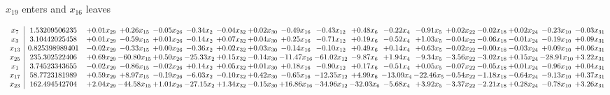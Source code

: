 \documentclass[9pt]{article}
\begin{document}
 $ x_{19} $ enters and $ x_{16} $ leaves 

 \[\begin{array}{c| c c@{\hskip 2pt} c@{\hskip 2pt} c@{\hskip 2pt} c@{\hskip 2pt} c@{\hskip 2pt} c@{\hskip 2pt} c@{\hskip 2pt} c@{\hskip 2pt} c@{\hskip 2pt} c@{\hskip 2pt} c@{\hskip 2pt} c@{\hskip 2pt} c@{\hskip 2pt} c@{\hskip 2pt} c@{\hskip 2pt} c@{\hskip 2pt} }
 x_{7}   &  1.53209506235 & +  0.01 x_{29} & +  0.26 x_{15} & -0.05 x_{26} & -0.34 x_{2} & -0.04 x_{32} & +  0.02 x_{30} & -0.49 x_{16} & -0.43 x_{12} & +  0.48 x_{6} & -0.22 x_{4} & -0.91 x_{5} & +  0.02 x_{22} & -0.02 x_{18} & +  0.02 x_{24} & -0.23 x_{10} & -0.03 x_{31}\\
 x_{3}   &  3.10442025458 & +  0.01 x_{29} & -0.59 x_{15} & +  0.01 x_{26} & -0.14 x_{2} & +  0.07 x_{32} & +  0.04 x_{30} & +  0.25 x_{16} & -0.71 x_{12} & +  0.19 x_{6} & -0.52 x_{4} & +  1.03 x_{5} & -0.04 x_{22} & -0.06 x_{18} & -0.01 x_{24} & -0.19 x_{10} & +  0.09 x_{31}\\
 x_{13}   &  0.825398989401 & -0.02 x_{29} & -0.33 x_{15} & +  0.00 x_{26} & -0.36 x_{2} & +  0.02 x_{32} & +  0.03 x_{30} & -0.14 x_{16} & -0.10 x_{12} & +  0.49 x_{6} & +  0.14 x_{4} & +  0.63 x_{5} & -0.02 x_{22} & -0.00 x_{18} & -0.03 x_{24} & +  0.09 x_{10} & +  0.06 x_{31}\\
 x_{25}   &  235.302522406 & +  0.69 x_{29} & -60.80 x_{15} & +  0.50 x_{26} & -25.33 x_{2} & +  0.15 x_{32} & -0.14 x_{30} & -11.47 x_{16} & -61.02 x_{12} & -9.87 x_{6} & +  1.94 x_{4} & -9.34 x_{5} & -3.56 x_{22} & -3.02 x_{18} & +  0.15 x_{24} & -28.91 x_{10} & +  3.22 x_{31}\\
 x_{1}   &  3.74523343655 & -0.02 x_{29} & -0.86 x_{15} & -0.02 x_{26} & +  0.14 x_{2} & +  0.05 x_{32} & +  0.01 x_{30} & +  0.18 x_{16} & -0.90 x_{12} & +  0.17 x_{6} & -0.51 x_{4} & +  0.05 x_{5} & -0.07 x_{22} & -0.05 x_{18} & +  0.01 x_{24} & -0.96 x_{10} & +  0.04 x_{31}\\
 x_{17}   &  58.7723181989 & +  0.59 x_{29} & +  8.97 x_{15} & -0.19 x_{26} & -6.03 x_{2} & -0.10 x_{32} & +  0.42 x_{30} & -0.65 x_{16} & -12.35 x_{12} & +  4.99 x_{6} & -13.09 x_{4} & -22.46 x_{5} & -0.54 x_{22} & -1.18 x_{18} & -0.64 x_{24} & -9.13 x_{10} & +  0.37 x_{31}\\
 x_{23}   &  162.494542704 & +  2.04 x_{29} & -44.58 x_{15} & +  1.01 x_{26} & -27.15 x_{2} & +  1.34 x_{32} & -0.15 x_{30} & + 16.86 x_{16} & -34.96 x_{12} & -32.03 x_{6} & -5.68 x_{4} & +  3.92 x_{5} & -3.37 x_{22} & -2.21 x_{18} & +  0.28 x_{24} & -0.78 x_{10} & +  3.26 x_{31}\\

\end{array}\]
\end{document}
